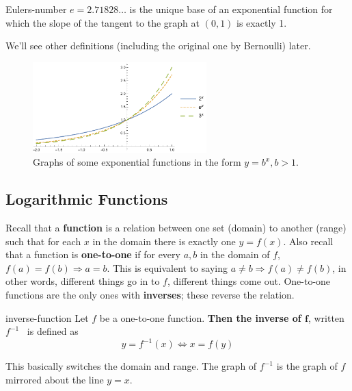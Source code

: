 \documentclass[letterpaper, 11pt, openany]{book}
\theoremstyle{mytheoremstyle}
\theoremstyle{myexamplestyle}
\begin{document}
\begin{definition}{}{Eulers-number}
    \(e = 2.71828\ldots\) is the unique base of an exponential function for which the slope of the tangent to the graph at \((0,1)\) is exactly 1.
\end{definition}
We'll see other definitions (including the original one by Bernoulli) later.
\begin{figure}[htbp]
    \centering
        \includegraphics[width=0.6\textwidth]{Figures/expfunctions.pdf}
    \caption{Graphs of some exponential functions in the form $y = b^{x},b > 1$.}
    \label{f:expfunctions}
\end{figure}

\subsection{Logarithmic Functions}
Recall that a \textbf{function} is a relation between one set (domain) to another (range) such that for each $x$ in the domain there is exactly one $y = f(x)$. Also recall that a function is \textbf{one-to-one} if for every $a, b$ in the domain of $f$, $f(a) = f(b) \Rightarrow a = b$. This is equivalent to saying $a \neq b \Rightarrow f(a) \neq f(b)$, in other words, different things go in to $f$, different things come out. One-to-one functions are the only ones with \textbf{inverses}; these reverse the relation.

\begin{definition}{}{inverse-function}
    Let \(f\) be a one-to-one function. \textbf{Then the inverse of \(\bm{f}\)}, written \(f^{-1}\) \faFrown \ is defined as
    \[y = f^{-1}(x) \Leftrightarrow x = f(y)\]
\end{definition}
This basically switches the domain and range. The graph of $f^{-1}$ is the graph of $f$ mirrored about the line $y = x$.
\end{document}
